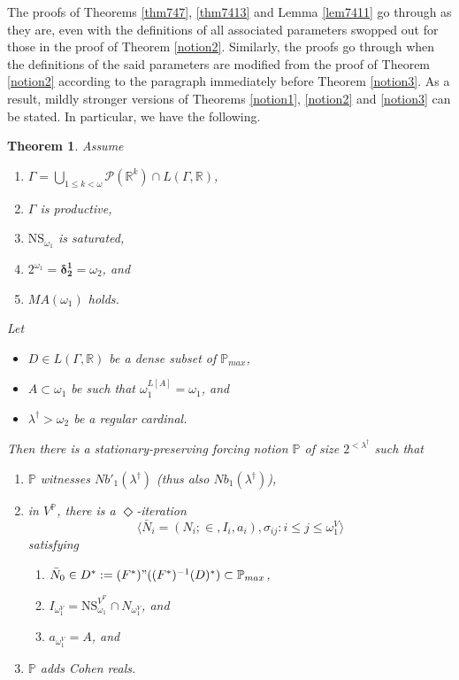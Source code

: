 \documentclass[12pt, twoside]{memoir}
\numberwithin{equation}{section}
\newtheorem{thm}{Theorem}[section]
\theoremstyle{definition}
\theoremstyle{remark}
\theoremstyle{definition}
\theoremstyle{definition}
\theoremstyle{definition}
\theoremstyle{remark}
\begin{document}
The proofs of Theorems \ref{thm747}, \ref{thm7413} and Lemma \ref{lem7411} go through as they are, even with the definitions of all associated parameters swopped out for those in the proof of Theorem \ref{notion2}. Similarly, the proofs go through when the definitions of the said parameters are modified from the proof of Theorem \ref{notion2} according to the paragraph immediately before Theorem \ref{notion3}. As a result, mildly stronger versions of Theorems \ref{notion1}, \ref{notion2} and \ref{notion3} can be stated. In particular, we have the following.

\begin{thm}
Assume
\begin{enumerate}[label=(\roman*), leftmargin=40pt]
    \item $\Gamma  = \bigcup_{1 \leq k < \omega} \mathcal{P}(\mathbb{R}^{k}) \cap L(\Gamma, \mathbb{R})$,
    \item $\Gamma$ is productive,
    \item $\mathrm{NS}_{\omega_1}$ is saturated,
    \item $2^{\omega_1} = \mathbf{\delta^1_2} = \omega_2$, and
    \item $MA(\omega_1)$ holds.
\end{enumerate}
Let 
\begin{itemize}
    \item $D \in L(\Gamma, \mathbb{R})$ be a dense subset of $\mathbb{P}_{max}$,
    \item $A \subset \omega_1$ be such that $\omega_1^{L[A]} = \omega_1$, and
    \item $\lambda^{\dagger} > \omega_2$ be a regular cardinal.
\end{itemize}
Then there is a stationary-preserving forcing notion $\mathbb{P}$ of size $2^{< \lambda^{\dagger}}$ such that 
\begin{enumerate}[label=(\alph*)]
    \item $\mathbb{P}$ witnesses $Nb'_1(\lambda^{\dagger})$ (thus also $Nb_1(\lambda^{\dagger})$),
    \item in $V^{\mathbb{P}}$, there is a $\Diamond$-iteration $$\langle \bar{N}_i = (N_i; \in, I_i, a_i), \sigma_{ij} : i \leq j \leq \omega_1^V \rangle$$ satisfying 
    \begin{enumerate}[label=(\arabic*), leftmargin=40pt]
        \item $\bar{N}_0 \in D^* := (F^*) " ((F^*)^{-1}(D)^*) \subset \mathbb{P}_{max}$,
        \item $I_{\omega_1^V} = \mathrm{NS}_{\omega_1}^{V^{\mathbb{P}}} \cap N_{\omega_1^V}$, and
        \item $a_{\omega_1^V} = A$, and
    \end{enumerate}
    \item $\mathbb{P}$ adds Cohen reals.
\end{enumerate}
\end{thm}
\end{document}
